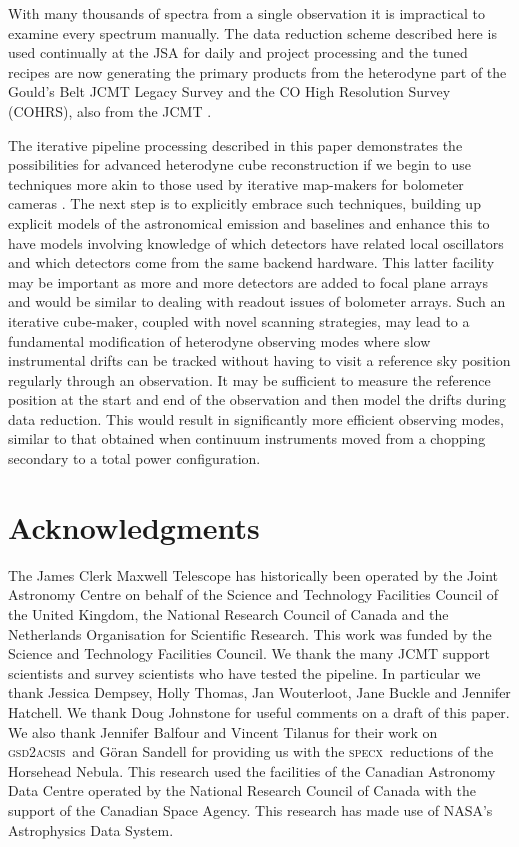 \documentclass[useAMS,usenatbib]{mn2e}
\newcommand{\specx}{\textsc{specx}}
\newcommand{\gsdacsis}{\textsc{gsd{\footnotesize{2}}acsis}}
\begin{document}
With many thousands of spectra from a single observation it is
impractical to examine every spectrum manually. The data reduction
scheme described here is used continually at the JSA
\citep{2011ASPC..442..203E,2014SPIE9152-93} for daily and project processing and the
tuned recipes are now generating the primary products from the
heterodyne part of the Gould's Belt JCMT Legacy Survey
\citep{2007PASP..119..855W} and the CO High Resolution Survey
(COHRS), also from the JCMT \citep{2013ApJS..209....8D}.

The iterative pipeline processing described in this paper demonstrates
the possibilities for advanced heterodyne cube reconstruction if we
begin to use techniques more akin to those used by iterative
map-makers for bolometer cameras
\citep[e.g.,][]{2013MNRAS.430.2545C}. The next step is to explicitly
embrace such techniques, building up explicit models of the
astronomical emission and baselines and enhance this to have models
involving knowledge of which detectors have related local oscillators
and which detectors come from the same backend hardware. This latter
facility may be important as more and more detectors are added to
focal plane arrays and would be similar to dealing with readout issues
of bolometer arrays. Such an iterative cube-maker, coupled with novel
scanning strategies, may lead to a fundamental modification of
heterodyne observing modes where slow instrumental drifts can be
tracked without having to visit a reference sky position regularly
through an observation. It may be sufficient to measure the reference
position at the start and end of the observation and then model the
drifts during data reduction. This would result in significantly more
efficient observing modes, similar to that obtained when continuum
instruments moved from a chopping secondary to a total power
configuration.

\section{Acknowledgments}

The James Clerk Maxwell Telescope has historically been operated by
the Joint Astronomy Centre on behalf of the Science and Technology
Facilities Council of the United Kingdom, the National Research
Council of Canada and the Netherlands Organisation for Scientific
Research. This work was funded by the Science and Technology Facilities
Council. We thank the many JCMT support scientists and survey
scientists who have tested the pipeline. In particular we thank
Jessica Dempsey, Holly Thomas, Jan Wouterloot, Jane Buckle and
Jennifer Hatchell. We thank Doug Johnstone for useful comments on a
draft of this paper. We also thank Jennifer Balfour and
Vincent Tilanus for their work on \gsdacsis\ and
G\"{o}ran Sandell for providing us with the \specx\ reductions of the Horsehead
Nebula. This research used the facilities of the Canadian Astronomy
Data Centre operated by the National Research Council of Canada with
the support of the Canadian Space Agency. This research has made use
of NASA's Astrophysics Data System.
\end{document}
